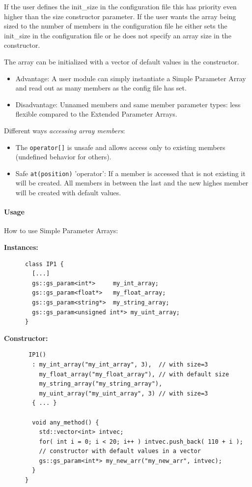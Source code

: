 If the user defines the \textsf{init\_size} in the configuration file this has priority even higher than the size constructor parameter. If the user wants the array being sized to the number of members in the configuration file he either sets the \textsf{init\_size} in the configuration file or he does not specify an array size in the constructor.

The array can be initialized with a vector of default values in the constructor.
\begin{itemize}
   \item Advantage: A user module can simply instantiate a Simple Parameter Array and read out as many members as the config file has set.
   \item Disadvantage: Unnamed members and same member parameter types: less flexible compared to the Extended Parameter Arrays.
\end{itemize}

Different ways {\em accessing array members}:
\begin{itemize}
	\item The \lstinline[language=TeX]|operator[]| is unsafe and allows access only
		to existing members (undefined behavior for others).
	\item Safe \lstinline|at(position)| 'operator': If a member is accessed that is not existing
   				it will be created. All members in between the last and the new highes member will be created
		with default values. %
\end{itemize}

\paragraph{Usage} How to use Simple Parameter Arrays:

\noindent
\begin{minipage}{\textwidth}
{\bf Instances:}
\begin{lstlisting}
      class IP1 {
        [...]
        gs::gs_param<int*>     my_int_array;
        gs::gs_param<float*>   my_float_array;
        gs::gs_param<string*>  my_string_array;
        gs::gs_param<unsigned int*> my_uint_array;
      }
\end{lstlisting}
\end{minipage}

\noindent
\begin{minipage}{\textwidth}
{\bf Constructor:}
\begin{lstlisting}
       IP1()
        : my_int_array("my_int_array", 3),  // with size=3
          my_float_array("my_float_array"), // with default size
          my_string_array("my_string_array"),
          my_uint_array("my_uint_array", 3) // with size=3
        { ... }

        void any_method() {
          std::vector<int> intvec;
          for( int i = 0; i < 20; i++ ) intvec.push_back( 110 + i );
          // constructor with default values in a vector
          gs::gs_param<int*> my_new_arr("my_new_arr", intvec);
        }
      }
\end{lstlisting}
\end{minipage}

